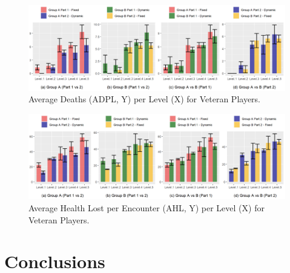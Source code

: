 \begin{figure}[!ht]
    \caption{Average Deaths (ADPL, Y) per Level (X) for Veteran Players.}
    \begin{center}
        \includegraphics[width=34em]{figures/deaths_per_level-veteran_players.png}
    \end{center}
    \label{fig:result-metric-veterans-deaths-per-level}
\end{figure}

\begin{figure}[!ht]
    \caption{Average Health Lost per Encounter (AHL, Y) per Level (X) for Veteran Players.}
    \begin{center}
        \includegraphics[width=34em]{figures/health_lost_per_encounter-veteran_players.png}
    \end{center}
    \label{fig:result-metric-veterans-health-lost-per-encounter}
\end{figure}


\section{Conclusions}

